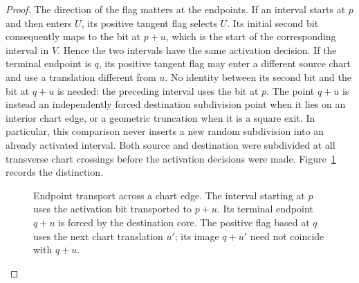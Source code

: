 \begin{proof}
The direction of the flag matters at the endpoints.  If an interval
starts at $p$ and then enters $U$, its positive tangent flag selects $U$.
Its initial second bit consequently maps to the bit at $p+u$, which is
the start of the corresponding interval in $V$.  Hence the two intervals
have the same activation decision.  If the terminal endpoint is $q$, its
positive tangent flag may enter a different source chart and use a
translation different from $u$.  No identity between its second bit and
the bit at $q+u$ is needed: the preceding interval uses the bit at $p$.
The point $q+u$ is instead an independently forced destination subdivision
point when it lies on an interior chart edge, or a geometric truncation
when it is a square exit.  In particular, this comparison never inserts
a new random subdivision into an already activated interval.  Both source
and destination were subdivided at all transverse chart crossings before
the activation decisions were made.  Figure~\ref{fig:am-endpoints}
records the distinction.

\begin{figure}[tb]
\centering
{}
\caption{Endpoint transport across a chart edge.  The interval starting at
$p$ uses the activation bit transported to $p+u$.  Its terminal endpoint
$q+u$ is forced by the destination core.  The positive flag based at $q$
uses the next chart translation $u'$; its image $q+u'$ need not coincide
with $q+u$.}
\label{fig:am-endpoints}
\end{figure}


\end{proof}
